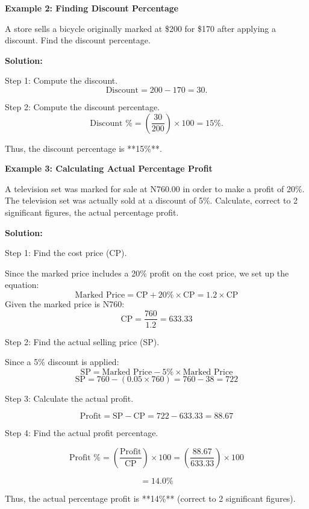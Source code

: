 \begin{flushleft}
	\textbf{Example 2: Finding Discount Percentage}
	
	A store sells a bicycle originally marked at \$200 for \$170 after applying a discount. Find the discount percentage.
	
	\textbf{Solution:}
	
	Step 1: Compute the discount.
	\[
	\text{Discount} = 200 - 170 = 30.
	\]
	
	Step 2: Compute the discount percentage.
	\[
	\text{Discount \%} = \left( \frac{30}{200} \right) \times 100 = 15\%.
	\]
	
	Thus, the discount percentage is **15\%**.
\end{flushleft}

\begin{flushleft}
	\textbf{Example 3: Calculating Actual Percentage Profit}
	
	A television set was marked for sale at N760.00 in order to make a profit of 20\%. The television set was actually sold at a discount of 5\%. Calculate, correct to 2 significant figures, the actual percentage profit.
	
	\textbf{Solution:}
	
	Step 1: Find the cost price (CP).
	
	Since the marked price includes a 20\% profit on the cost price, we set up the equation:
	\[
	\text{Marked Price} = \text{CP} + 20\% \times \text{CP} = 1.2 \times \text{CP}
	\]
	Given the marked price is N760:
	\[
	\text{CP} = \frac{760}{1.2} = 633.33
	\]
	
	Step 2: Find the actual selling price (SP).
	
	Since a 5\% discount is applied:
	\[
	\text{SP} = \text{Marked Price} - 5\% \times \text{Marked Price}
	\]
	\[
	\text{SP} = 760 - (0.05 \times 760) = 760 - 38 = 722
	\]
	
	Step 3: Calculate the actual profit.
	
	\[
	\text{Profit} = \text{SP} - \text{CP} = 722 - 633.33 = 88.67
	\]
	
	Step 4: Find the actual profit percentage.
	
	\[
	\text{Profit \%} = \left(\frac{\text{Profit}}{\text{CP}}\right) \times 100 = \left(\frac{88.67}{633.33}\right) \times 100
	\]
	
	\[
	= 14.0\%
	\]
	
	Thus, the actual percentage profit is **14\%** (correct to 2 significant figures).
\end{flushleft}
